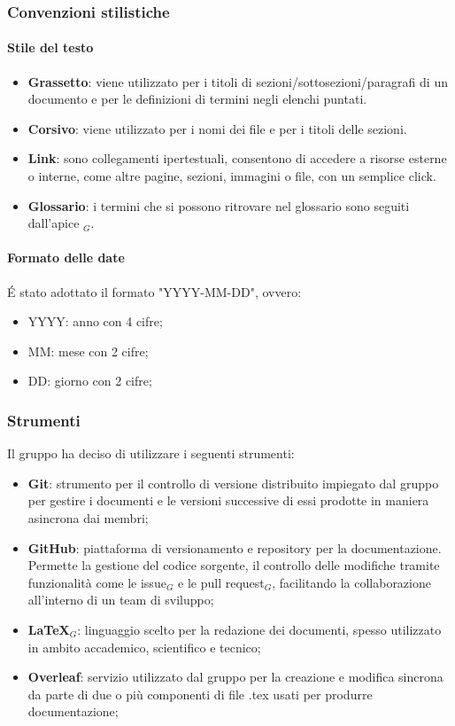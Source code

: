 \subsubsection{Convenzioni stilistiche}
    \paragraph{Stile del testo}
    \begin{itemize}
        \item \textbf{Grassetto}: viene utilizzato per i titoli di sezioni/sottosezioni/paragrafi di un documento e per le definizioni di termini negli elenchi puntati.
        \item \textbf{Corsivo}: viene utilizzato per i nomi dei file e per i titoli delle sezioni.
        \item \textbf{Link}: sono collegamenti ipertestuali, consentono di accedere a risorse esterne o interne, come altre pagine, sezioni, immagini o file, con un semplice click.
        \item \textbf{Glossario}: i termini che si possono ritrovare nel glossario sono seguiti dall'apice $_G$.
    \end{itemize}

    \paragraph{Formato delle date}
    \'E stato adottato il formato "YYYY-MM-DD", ovvero:
    \begin{itemize}
        \item YYYY: anno con 4 cifre;
        \item MM: mese con 2 cifre;
        \item DD: giorno con 2 cifre;
    \end{itemize}

\subsubsection{Strumenti}
Il gruppo ha deciso di utilizzare i seguenti strumenti:
\begin{itemize}
    \item \textbf{Git}: strumento per il controllo di versione distribuito impiegato dal gruppo per gestire i documenti e le versioni successive di essi prodotte in maniera asincrona dai membri;
    \item \textbf{GitHub}: piattaforma di versionamento e repository per la documentazione. Permette la gestione del codice sorgente, il controllo delle modifiche tramite funzionalità come le issue$_G$ e le pull request$_G$, facilitando la collaborazione all’interno di un team di sviluppo;
    \item \textbf{\LaTeX}$_G$: linguaggio scelto per la redazione dei documenti, spesso utilizzato in ambito accademico, scientifico e tecnico;
    \item \textbf{Overleaf}: servizio utilizzato dal gruppo per la creazione e modifica sincrona da parte di due o più componenti di file .tex usati per produrre documentazione;
\end{itemize}